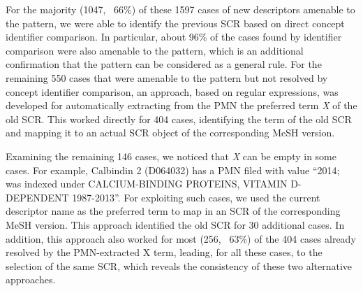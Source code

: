 For the majority (1047, ~66\%) of these 1597 cases of new descriptors amenable to the pattern, we were able to identify the previous SCR based on direct concept identifier comparison. In particular, about 96\% of the cases found by identifier comparison were also amenable to the pattern, which is an additional confirmation that the pattern can be considered as a general rule. 
For the remaining 550 cases that were amenable to the pattern but not resolved by concept identifier comparison, an approach, based on regular expressions, was developed for automatically extracting from the PMN the preferred term \textit{X} of the old SCR. This worked directly for 404 cases, identifying the term of the old SCR and mapping it to an actual SCR object of the corresponding MeSH version. 

Examining the remaining 146 cases, we noticed that\textit{ X} can be empty in some cases. For example, Calbindin 2 (D064032) has a PMN filed with value ``2014; was indexed under CALCIUM-BINDING PROTEINS, VITAMIN D-DEPENDENT 1987-2013''. For exploiting such cases, we used the current descriptor name as the preferred term to map in an SCR of the corresponding MeSH version. This approach identified the old SCR for 30 additional cases. In addition, this approach also worked for most (256, ~63\%) of the 404 cases already resolved by the PMN-extracted X term, leading, for all these cases, to the selection of the same SCR, which reveals the consistency of these two alternative approaches.


